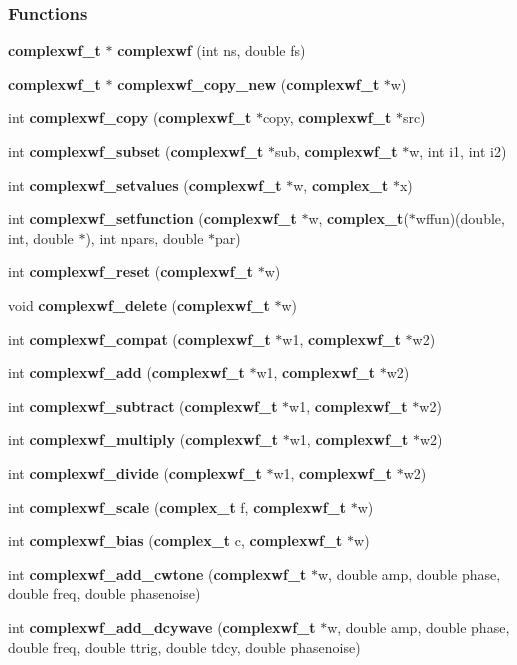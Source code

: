 \subsubsection*{Functions}
\begin{CompactItemize}
\item 
{\bf complexwf\_\-t} $\ast$ {\bf complexwf} (int ns, double fs)
\item 
{\bf complexwf\_\-t} $\ast$ {\bf complexwf\_\-copy\_\-new} ({\bf complexwf\_\-t} $\ast$w)
\item 
int {\bf complexwf\_\-copy} ({\bf complexwf\_\-t} $\ast$copy, {\bf complexwf\_\-t} $\ast$src)
\item 
int {\bf complexwf\_\-subset} ({\bf complexwf\_\-t} $\ast$sub, {\bf complexwf\_\-t} $\ast$w, int i1, int i2)
\item 
int {\bf complexwf\_\-setvalues} ({\bf complexwf\_\-t} $\ast$w, {\bf complex\_\-t} $\ast$x)
\item 
int {\bf complexwf\_\-setfunction} ({\bf complexwf\_\-t} $\ast$w, {\bf complex\_\-t}($\ast$wffun)(double, int, double $\ast$), int npars, double $\ast$par)
\item 
int {\bf complexwf\_\-reset} ({\bf complexwf\_\-t} $\ast$w)
\item 
void {\bf complexwf\_\-delete} ({\bf complexwf\_\-t} $\ast$w)
\item 
int {\bf complexwf\_\-compat} ({\bf complexwf\_\-t} $\ast$w1, {\bf complexwf\_\-t} $\ast$w2)
\item 
int {\bf complexwf\_\-add} ({\bf complexwf\_\-t} $\ast$w1, {\bf complexwf\_\-t} $\ast$w2)
\item 
int {\bf complexwf\_\-subtract} ({\bf complexwf\_\-t} $\ast$w1, {\bf complexwf\_\-t} $\ast$w2)
\item 
int {\bf complexwf\_\-multiply} ({\bf complexwf\_\-t} $\ast$w1, {\bf complexwf\_\-t} $\ast$w2)
\item 
int {\bf complexwf\_\-divide} ({\bf complexwf\_\-t} $\ast$w1, {\bf complexwf\_\-t} $\ast$w2)
\item 
int {\bf complexwf\_\-scale} ({\bf complex\_\-t} f, {\bf complexwf\_\-t} $\ast$w)
\item 
int {\bf complexwf\_\-bias} ({\bf complex\_\-t} c, {\bf complexwf\_\-t} $\ast$w)
\item 
int {\bf complexwf\_\-add\_\-cwtone} ({\bf complexwf\_\-t} $\ast$w, double amp, double phase, double freq, double phasenoise)
\item 
int {\bf complexwf\_\-add\_\-dcywave} ({\bf complexwf\_\-t} $\ast$w, double amp, double phase, double freq, double ttrig, double tdcy, double phasenoise)

\end{CompactItemize}
